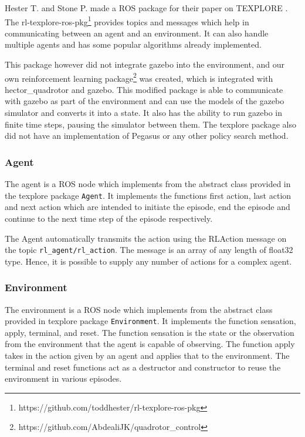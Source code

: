 \documentclass[hidelinks,BTech]{iitmdiss}
\begin{document}
Hester T. and Stone P. made a ROS package for their paper on TEXPLORE \cite{Texplore}. The rl-texplore-ros-pkg\footnote{https://github.com/toddhester/rl-texplore-ros-pkg} provides topics and messages which help in communicating between an agent and an environment. It can also handle multiple agents and has some popular algorithms already implemented.

This package however did not integrate gazebo into the environment, and our own reinforcement learning package\footnote{https://github.com/AbdealiJK/quadrotor\_control} was created, which is integrated with hector\_quadrotor and gazebo. This modified package is able to communicate with gazebo as part of the environment and can use the models of the gazebo simulator and converts it into a state. It also has the ability to run gazebo in finite time steps, pausing the simulator between them. The texplore package also did not have an implementation of Pegasus or any other policy search method.

\subsubsection{Agent}

The agent is a ROS node which implements from the abstract class provided in the texplore package \texttt{Agent}. It implements the functions first action, last action and next action which are intended to initiate the episode, end the episode and continue to the next time step of the episode respectively.

The Agent automatically transmits the action using the RLAction message on the topic \texttt{rl\_agent/rl\_action}. The message is an array of any length of float32 type. Hence, it is possible to supply any number of actions for a complex agent.

\subsubsection{Environment}

The environment is a ROS node which implements from the abstract class provided in texplore package \texttt{Environment}. It implements the function sensation, apply, terminal, and reset. The function sensation is the state or the observation from the environment that the agent is capable of observing. The function apply takes in the action given by an agent and applies that to the environment. The terminal and reset functions act as a destructor and constructor to reuse the environment in various episodes.
\end{document}
